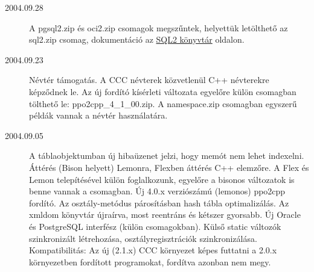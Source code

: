 \begin{description}
\item[2004.09.28]
    A pgsql2.zip és oci2.zip csomagok megszűntek, 
    helyettük letölthető az  sql2.zip csomag,  dokumentáció az 
    \href{http://ok.comfirm.hu/ccc2/sql2.html}{SQL2 könyvtár} oldalon.

\label{NAMESPACE}
\item[2004.09.23]
    Névtér támogatás.
    A CCC névterek közvetlenül C++ névterekre képződnek le.
    Az új fordító kísérleti változata egyelőre külön csomagban tölthető le:
    ppo2cpp\_4\_1\_00.zip.
    A namespace.zip csomagban egyszerű példák vannak a névtér használatára.

\item[2004.09.05]
    A táblaobjektumban új hibaüzenet jelzi, hogy memót nem lehet indexelni.
    Áttérés (Bison helyett) Lemonra, Flexben áttérés C++ elemzőre.
    A Flex és Lemon  telepítésével külön foglalkozunk,
    egyelőre a bisonos változatok is benne vannak a csomagban.
    Új 4.0.x verziószámú (lemonos) ppo2cpp fordító. 
    Az osztály-metódus párosításban hash tábla optimalizálás.
    Az xmldom könyvtár újraírva, most reentráns és kétszer gyorsabb.
    Új Oracle és PostgreSQL interfész (külön csomagokban).
    Külső static változók szinkronizált létrehozása,
    osztályregisztrációk szinkronizálása.
    Kompatibilitás: Az új (2.1.x) CCC környezet képes
    futtatni a 2.0.x környezetben fordított programokat,
    fordítva azonban nem megy.


\end{description}
